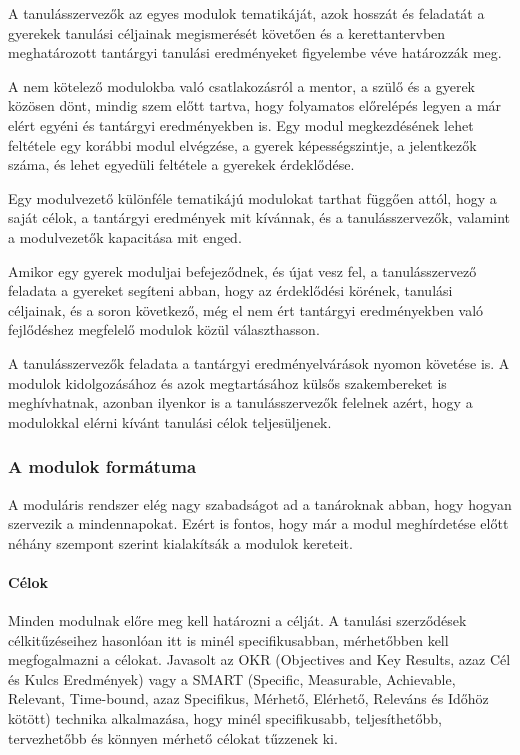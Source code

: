 A tanulásszervezők az egyes modulok tematikáját, azok hosszát és feladatát a gyerekek tanulási céljainak megismerését követően és a kerettantervben meghatározott tantárgyi tanulási eredményeket figyelembe véve határozzák meg.

A nem kötelező modulokba való csatlakozásról a mentor, a szülő és a gyerek közösen dönt, mindig szem előtt tartva, hogy folyamatos előrelépés legyen a már elért egyéni és tantárgyi eredményekben is. Egy modul megkezdésének lehet feltétele egy korábbi modul elvégzése, a gyerek képességszintje, a jelentkezők száma, és lehet egyedüli feltétele a gyerekek érdeklődése.

Egy modulvezető különféle tematikájú modulokat tarthat függően attól, hogy a saját célok, a tantárgyi eredmények mit kívánnak, és a tanulásszervezők, valamint a modulvezetők kapacitása mit enged.

Amikor egy gyerek moduljai befejeződnek, és újat vesz fel, a tanulásszervező feladata a gyereket segíteni abban, hogy az érdeklődési körének, tanulási céljainak, és a soron következő, még el nem ért tantárgyi eredményekben való fejlődéshez megfelelő modulok közül választhasson.

A tanulásszervezők feladata a tantárgyi eredményelvárások nyomon követése is. A modulok kidolgozásához és azok megtartásához külsős szakembereket is meghívhatnak, azonban ilyenkor is a tanulásszervezők felelnek azért, hogy a modulokkal elérni kívánt tanulási célok teljesüljenek.

\subsubsection{A modulok formátuma}

A moduláris rendszer elég nagy szabadságot ad a tanároknak abban, hogy hogyan szervezik a mindennapokat. Ezért is fontos, hogy már a modul meghírdetése előtt néhány szempont szerint kialakítsák a modulok kereteit.

\paragraph{Célok} Minden modulnak előre meg kell határozni a célját. A tanulási szerződések célkitűzéseihez hasonlóan itt is minél specifikusabban, mérhetőbben kell megfogalmazni a célokat. Javasolt az OKR  (Objectives and Key Results, azaz	Cél és Kulcs Eredmények) \citep{okr} vagy a SMART (Specific, Measurable, Achievable, Relevant, Time-bound, azaz Specifikus,  Mérhető, Elérhető, Releváns és Időhöz kötött) \citep{wiki:smart} technika alkalmazása, hogy minél specifikusabb, teljesíthetőbb, tervezhetőbb és könnyen mérhető célokat tűzzenek ki.

